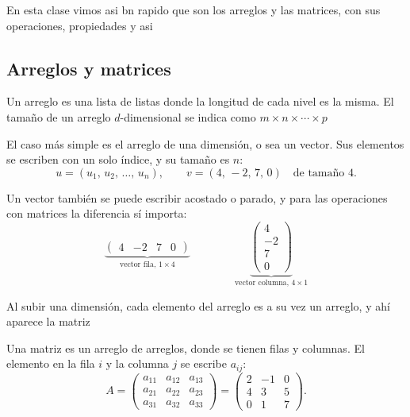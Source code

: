 \documentclass[11pt,letterpaper]{article}
\begin{document}
\newpage




\begin{quick_sum}
    En esta clase vimos asi bn rapido que son los arreglos y las matrices,
    con sus operaciones, propiedades y asi
\end{quick_sum}

\subsection*{Arreglos y matrices}

Un arreglo es una lista de listas donde la longitud de cada nivel es
la misma. El tamaño de un arreglo $d$-dimensional se indica como
$m \times n \times \cdots \times p$

El caso más simple es el arreglo de una dimensión, o sea un vector.
Sus elementos se escriben con un solo índice, y su tamaño es $n$:
\[
    u = (u_1,\, u_2,\, \ldots,\, u_n) ,
    \qquad
    v = (4,\, -2,\, 7,\, 0) \quad \text{de tamaño } 4 .
\]

Un vector también se puede escribir acostado o parado, y para las
operaciones con matrices la diferencia sí importa:
\[
    \underbrace{\begin{pmatrix} 4 & -2 & 7 & 0 \end{pmatrix}}
              _{\text{vector fila, } 1 \times 4}
    \qquad\qquad
    \underbrace{\begin{pmatrix} 4 \\ -2 \\ 7 \\ 0 \end{pmatrix}}
              _{\text{vector columna, } 4 \times 1}
\]

Al subir una dimensión, cada elemento del arreglo es a su vez un
arreglo, y ahí aparece la matriz

Una matriz es un arreglo de arreglos, donde se tienen filas y
columnas. El elemento en la fila $i$ y la columna $j$ se escribe
$a_{ij}$:
\[
    A =
    \begin{pmatrix}
        a_{11} & a_{12} & a_{13} \\
        a_{21} & a_{22} & a_{23} \\
        a_{31} & a_{32} & a_{33}
    \end{pmatrix}
    =
    \begin{pmatrix}
        2 & -1 & 0 \\
        4 &  3 & 5 \\
        0 &  1 & 7
    \end{pmatrix} .
\]
\end{document}
